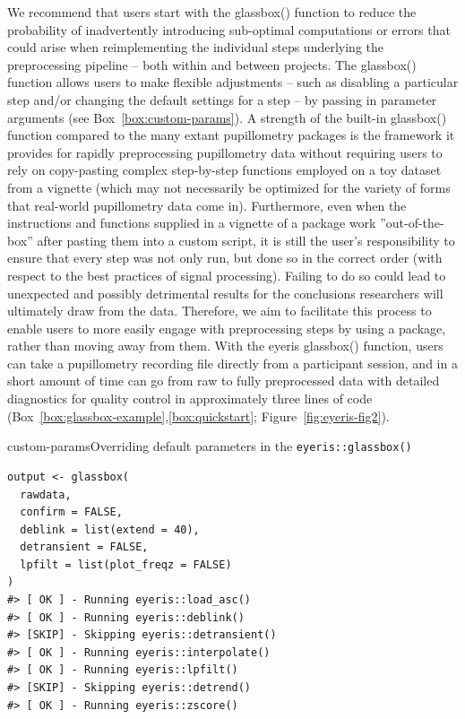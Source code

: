 We recommend that users start with the glassbox() function to reduce the probability of inadvertently introducing sub-optimal computations or errors that could arise when reimplementing the individual steps underlying the preprocessing pipeline – both within and between projects. The glassbox() function allows users to make flexible adjustments – such as disabling a particular step and/or changing the default settings for a step – by passing in parameter arguments (see Box~\ref{box:custom-params}). A strength of the built-in glassbox() function compared to the many extant pupillometry packages is the framework it provides for rapidly preprocessing pupillometry data without requiring users to rely on copy-pasting complex step-by-step functions employed on a toy dataset from a vignette (which may not necessarily be optimized for the variety of forms that real-world pupillometry data come in). Furthermore, even when the instructions and functions supplied in a vignette of a package work ”out-of-the-box” after pasting them into a custom script, it is still the user’s responsibility to ensure that every step was not only run, but done so in the correct order (with respect to the best practices of signal processing). Failing to do so could lead to unexpected and possibly detrimental results for the conclusions researchers will ultimately draw from the data. Therefore, we aim to facilitate this process to enable users to more easily engage with preprocessing steps by using a package, rather than moving away from them. With the eyeris glassbox() function, users can take a pupillometry recording file directly from a participant session, and in a short amount of time can go from raw to fully preprocessed data with detailed diagnostics for quality control in approximately three lines of code (Box~\ref{box:glassbox-example},\ref{box:quickstart}; Figure~\ref{fig:eyeris-fig2}).

\begin{eyerisbox}{custom-params}{Overriding default parameters in the \texttt{eyeris::glassbox()}}
\begin{lstlisting}
output <- glassbox(
  rawdata,
  confirm = FALSE,
  deblink = list(extend = 40),
  detransient = FALSE,
  lpfilt = list(plot_freqz = FALSE)
)
#> [ OK ] - Running eyeris::load_asc()
#> [ OK ] - Running eyeris::deblink()
#> [SKIP] - Skipping eyeris::detransient()
#> [ OK ] - Running eyeris::interpolate()
#> [ OK ] - Running eyeris::lpfilt()
#> [SKIP] - Skipping eyeris::detrend()
#> [ OK ] - Running eyeris::zscore()
\end{lstlisting}
\end{eyerisbox}

